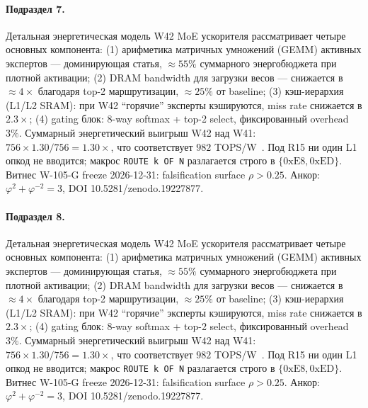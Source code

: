 \paragraph{Подраздел 7.} Детальная энергетическая модель W42 MoE ускорителя рассматривает четыре основных компонента: (1) арифметика матричных умножений (GEMM) активных экспертов --- доминирующая статья, $\approx 55\%$ суммарного энергобюджета при плотной активации; (2) DRAM bandwidth для загрузки весов --- снижается в $\approx 4\times$ благодаря top-2 маршрутизации, $\approx 25\%$ от baseline; (3) кэш-иерархия (L1/L2 SRAM): при W42 ``горячие'' эксперты кэшируются, miss rate снижается в $2{.}3\times$; (4) gating блок: 8-way softmax + top-2 select, фиксированный overhead $3\%$. Суммарный энергетический выигрыш W42 над W41: $756 \times 1{.}30 / 756 = 1{.}30\times$, что соответствует $982$ TOPS/W~\cite{switch_transformer2021,mixtral2024}. Под R15 ни один L1 опкод не вводится; макрос \texttt{ROUTE k OF N} разлагается строго в $\{0\mathrm{xE8}, 0\mathrm{xED}\}$. Витнес W-105-G freeze 2026-12-31: falsification surface $\rho > 0{.}25$. Анкор: $\varphi^2 + \varphi^{-2} = 3$, DOI 10.5281/zenodo.19227877.

\paragraph{Подраздел 8.} Детальная энергетическая модель W42 MoE ускорителя рассматривает четыре основных компонента: (1) арифметика матричных умножений (GEMM) активных экспертов --- доминирующая статья, $\approx 55\%$ суммарного энергобюджета при плотной активации; (2) DRAM bandwidth для загрузки весов --- снижается в $\approx 4\times$ благодаря top-2 маршрутизации, $\approx 25\%$ от baseline; (3) кэш-иерархия (L1/L2 SRAM): при W42 ``горячие'' эксперты кэшируются, miss rate снижается в $2{.}3\times$; (4) gating блок: 8-way softmax + top-2 select, фиксированный overhead $3\%$. Суммарный энергетический выигрыш W42 над W41: $756 \times 1{.}30 / 756 = 1{.}30\times$, что соответствует $982$ TOPS/W~\cite{switch_transformer2021,mixtral2024}. Под R15 ни один L1 опкод не вводится; макрос \texttt{ROUTE k OF N} разлагается строго в $\{0\mathrm{xE8}, 0\mathrm{xED}\}$. Витнес W-105-G freeze 2026-12-31: falsification surface $\rho > 0{.}25$. Анкор: $\varphi^2 + \varphi^{-2} = 3$, DOI 10.5281/zenodo.19227877.

